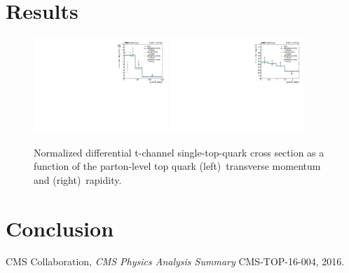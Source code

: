 \documentclass[12pt]{article}
\begin{document}
\section{Results}

\begin{figure}[th]
\begin{center}
\includegraphics[width=0.45\textwidth]{figures/result/unfolded_top_pt.pdf}\hspace{0.05\textwidth}
\includegraphics[width=0.45\textwidth]{figures/result/unfolded_top_y.pdf}
\end{center}

\caption{Normalized differential t-channel single-top-quark cross section as a function of the parton-level top quark (left)~transverse momentum and (right)~rapidity.}
\end{figure}



\section{Conclusion}



\begin{thebibliography}{99}

 CMS Collaboration, \emph{CMS Physics Analysis Summary} CMS-TOP-16-004, 2016.


\end{thebibliography}

 
\end{document}
